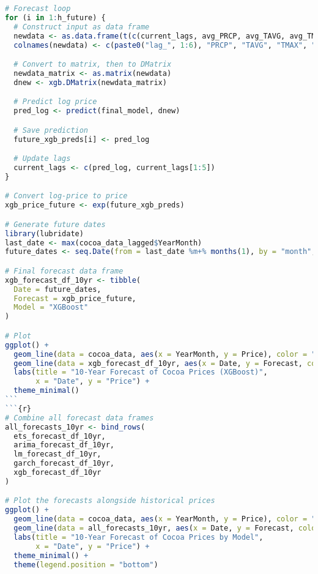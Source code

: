 \documentclass[10pt]{article}
\begin{document}
\begin{lstlisting}[language=R, caption=Forecast]
# Forecast loop
for (i in 1:h_future) {
  # Construct input as data frame
  newdata <- as.data.frame(t(c(current_lags, avg_PRCP, avg_TAVG, avg_TMAX, avg_TMIN)))
  colnames(newdata) <- c(paste0("lag_", 1:6), "PRCP", "TAVG", "TMAX", "TMIN")

  # Convert to matrix, then to DMatrix
  newdata_matrix <- as.matrix(newdata)
  dnew <- xgb.DMatrix(newdata_matrix)

  # Predict log price
  pred_log <- predict(final_model, dnew)

  # Save prediction
  future_xgb_preds[i] <- pred_log

  # Update lags
  current_lags <- c(pred_log, current_lags[1:5])
}

# Convert log-price to price
xgb_price_future <- exp(future_xgb_preds)

# Generate future dates
library(lubridate)
last_date <- max(cocoa_data_lagged$YearMonth)
future_dates <- seq.Date(from = last_date %m+% months(1), by = "month", length.out = h_future)

# Final forecast data frame
xgb_forecast_df_10yr <- tibble(
  Date = future_dates,
  Forecast = xgb_price_future,
  Model = "XGBoost"
)

# Plot
ggplot() +
  geom_line(data = cocoa_data, aes(x = YearMonth, y = Price), color = "black", linewidth = 1.2) +
  geom_line(data = xgb_forecast_df_10yr, aes(x = Date, y = Forecast, color = Model), linewidth = 1.2) +
  labs(title = "10-Year Forecast of Cocoa Prices (XGBoost)",
       x = "Date", y = "Price") +
  theme_minimal()
```
```{r}
# Combine all forecast data frames
all_forecasts_10yr <- bind_rows(
  ets_forecast_df_10yr,
  arima_forecast_df_10yr,
  lm_forecast_df_10yr,
  garch_forecast_df_10yr,
  xgb_forecast_df_10yr
)

# Plot the forecasts alongside historical prices
ggplot() +
  geom_line(data = cocoa_data, aes(x = YearMonth, y = Price), color = "black", linewidth = 1.2) +
  geom_line(data = all_forecasts_10yr, aes(x = Date, y = Forecast, color = Model, linetype = Model), linewidth = 1.2) +
  labs(title = "10-Year Forecast of Cocoa Prices by Model",
       x = "Date", y = "Price") +
  theme_minimal() +
  theme(legend.position = "bottom")
\end{lstlisting}
\end{document}
